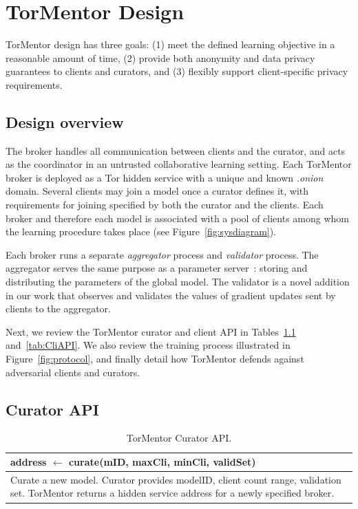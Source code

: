 
\chapter{TorMentor Design}
\label{sec:design}

TorMentor design has three goals: (1) meet the defined learning
objective in a reasonable amount of time, (2) provide both anonymity
and data privacy guarantees to clients and curators, and (3) flexibly
support client-specific privacy requirements.

\section{Design overview}

The broker handles all communication between
clients and the curator, and acts as the coordinator in an untrusted
collaborative learning setting. Each TorMentor broker is deployed as a
Tor hidden service with a unique and known \textit{.onion}
domain. Several clients may join a model once a curator defines it,
with requirements for joining specified by both the curator and the
clients. Each broker and therefore each model is associated with a pool
of clients among whom the learning procedure takes place (see 
Figure~\ref{fig:sysdiagram}).

Each broker runs a separate \emph{aggregator} process and 
\emph{validator} process. The aggregator serves the same purpose as a
parameter server~\cite{Li:2014}: storing and distributing the
parameters of the global model. The validator is a novel addition in
our work that observes and validates the values of gradient updates
sent by clients to the aggregator.

Next, we review the TorMentor curator and client \ac{API} in 
Tables~\ref{tab:CurAPI} and~\ref{tab:CliAPI}. We also review the
training process illustrated in Figure~\ref{fig:protocol}, and finally
detail how TorMentor defends against adversarial clients and curators.

\section{Curator API}

\begin{table}[t]
\begin{tabular}{p{\textwidth}}
 \hline \hline
 address $\leftarrow$ \textbf{curate}(mID, maxCli, minCli, validSet) \\
 \hline
 Curate a new model. Curator provides modelID,  
 client count range, validation set. TorMentor returns a hidden
 service address for a newly specified broker. \\
 \hline
\end{tabular} 
\caption{TorMentor Curator API.\label{tab:CurAPI} }
\end{table}


